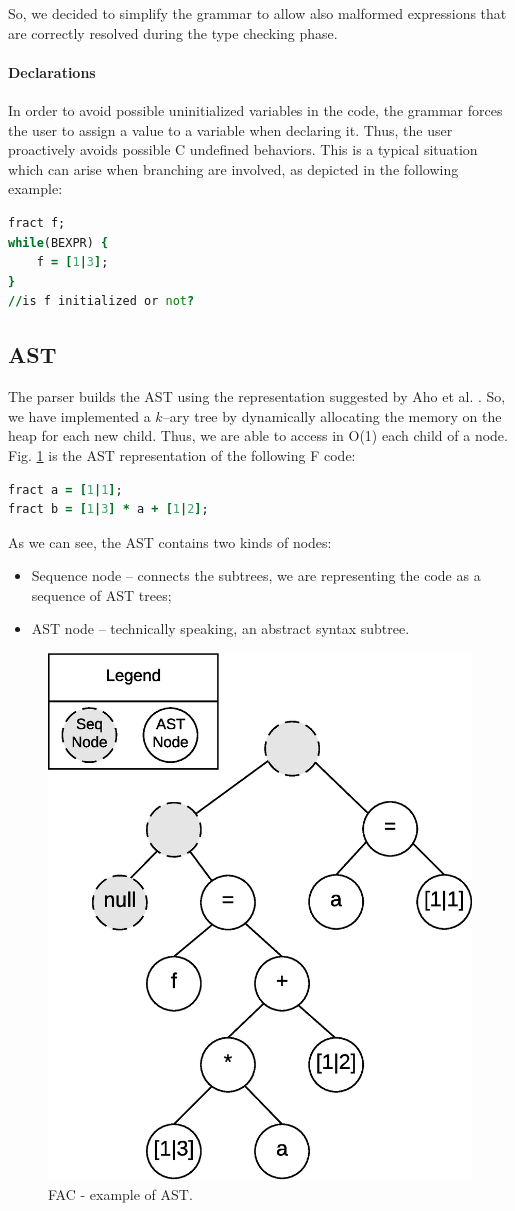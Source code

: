 So, we decided to simplify the grammar to allow also malformed expressions that
are correctly resolved during the type checking phase.


\paragraph{Declarations}

In order to avoid possible uninitialized variables in the code, the grammar
forces the user to assign a value to a variable when declaring it.
Thus, the user proactively avoids possible C undefined behaviors.
This is a typical situation which can arise
when branching are involved, as depicted in the following example:
\begin{lstlisting}[language=F, caption={Example of possible uninitialized 
variable.},captionpos=b,label=f-code0, frame = single]
fract f;
while(BEXPR) {
    f = [1|3];
}
//is f initialized or not?
\end{lstlisting}

\subsection{AST}
The parser builds the AST using the representation suggested by Aho et al. 
\cite{dragonbook}. So, we have implemented a $k$--ary
tree by dynamically allocating the memory on the heap for each new child. Thus, 
we are able to access in O(1) each child of a node.
Fig. \ref{fig:ast} is the AST representation of the following F code:
\begin{lstlisting}[language=F,caption={Example of F code},captionpos=b,
label=f-code1, frame=single]
fract a = [1|1];
fract b = [1|3] * a + [1|2];
\end{lstlisting}
As we can see, the AST contains two kinds of nodes:
\begin{itemize}
	\item Sequence node -- connects the subtrees, we are representing the 
	code as a sequence of AST trees;
	\item AST node -- technically speaking, an abstract syntax subtree.
\end{itemize}
\begin{figure}[H]
  \centering
  \includegraphics[width=.5\columnwidth]{img/eps/ast.eps}
  \caption{FAC - example of AST.}
  \label{fig:ast}
\end{figure}


